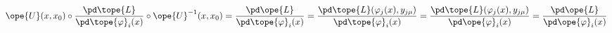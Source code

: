 \begin{equation*}
\ope{U}(x,x_0)\circ
	\frac{\pd\tope{L}} {\pd\tope{\varphi}_i(x)}
\circ \ope{U}^{-1}(x,x_0)
=
\frac{\pd\ope{L}} {\pd\tope{\varphi}_i(x)}
 =
\frac{\pd\tope{L}(\varphi_j(x),y_{j\mu})} {\pd\tope{\varphi}_i(x)}
=
\frac{\pd\tope{L}(\varphi_j(x),y_{j\mu})} {\pd\ope{\varphi}_i(x)}
=
\frac{\pd\ope{L}} {\pd\ope{\varphi}_i(x)}
	\end{equation*}

